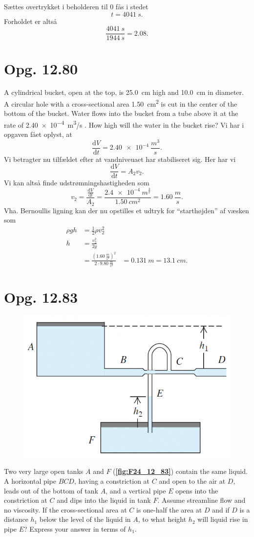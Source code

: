 \documentclass[12pt]{article}
\theoremstyle{definition}
\begin{document}
Sættes overtrykket i beholderen til 0 fås i stedet
\[ 
t = \qty{4041}{s}
.\]
Forholdet er altså
\[ 
\frac{\qty{4041}{s}}{\qty{1944}{s}} = \num{2,08} 
.\]




\section*{Opg. 12.80}
A cylindrical bucket, open at the top, is \qty{25,0}{cm} high and \qty{10,0}{cm} in diameter. A circular hole with a cross-sectional area \qty{1,50}{cm^2} is cut in the center of the bottom of the bucket. Water flows into the bucket from a tube above it at the rate of \qty{2,40e-4}{m^3/s} . How high will the water in the bucket rise?
\bigbreak
Vi har i opgaven fået oplyst, at
\[ 
\frac{\mathrm{d}V}{\mathrm{d}t} = \qty{2,40e-4}{\frac{m^3}{s}} 
.\]
Vi betragter nu tilfældet efter at vandniveuaet har stabiliseret sig. Her har vi 
\[ 
\frac{\mathrm{d}V}{\mathrm{d}t} = A_2 v_2
.\]
Vi kan altså finde udstrømningshastigheden som
\[ 
v_2 = \frac{\frac{\mathrm{d}V}{\mathrm{d}t} }{A_2} = \frac{\qty{2,4e-4}{m^\frac{3}{s}}}{\qty{1,50}{cm^2}} = \qty{1,60}{\frac{m}{s}} 
.\]
Vha. Bernoullis ligning kan der nu opstilles et udtryk for ``starthøjden'' af væsken som
\begin{align*}
  \rho g h &= \frac{1}{2}\rho v_2^2 \\
  h &= \frac{v_2^2}{2g} \\
    &= \frac{ \left( \qty{1,60}{\frac{m}{s^2}}  \right)^2 }{2 \cdot \qty{9,80}{\frac{m}{s^2}} }
    &= \qty{0,131}{m} = \qty{13,1}{cm} 
.\end{align*}



\section*{Opg. 12.83}
\begin{figure} [ht]
  \centering
  \caption{}
  \includegraphics[width=0.3\linewidth]{../figures/F24_12_83.png}
  \label{fig:F24_12_83}
\end{figure}
Two very large open tanks $A$ and $F$ (\textbf{\autoref{fig:F24_12_83}}) contain the same liquid. A horizontal pipe $BCD$, having a constriction at $C$ and open to the air at $D$, leads out of the bottom of tank $A$, and a vertical pipe $E$ opens into the constriction at $C$ and dips into the liquid in tank $F$. Assume streamline flow and no viscosity. If the cross-sectional area at $C$ is one-half the area at $D$ and if $D$ is a distance $h_1$ below the level of the liquid in $A$, to what height $h_2$ will liquid rise in pipe $E$? Express your answer in terms of $h_1$.
\end{document}
